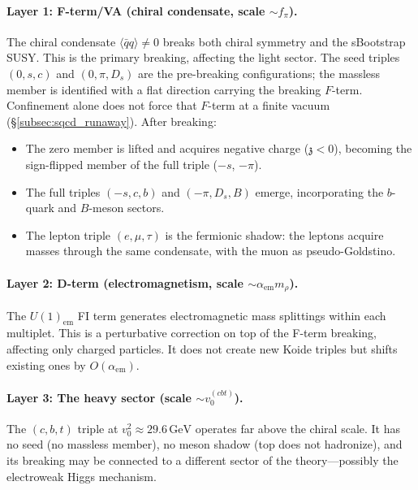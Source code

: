 \documentclass[12pt,a4paper]{article}
\newcommand{\GeV}{\,\text{GeV}}
\newcommand{\qqbar}{\langle\bar{q}q\rangle}
\newcommand{\zch}{\mathfrak{z}}
\begin{document}
\paragraph{Layer 1: F-term/VA (chiral condensate, scale $\sim f_\pi$).}
The chiral condensate $\qqbar \neq 0$ breaks both chiral symmetry 
and the sBootstrap SUSY. This is the primary breaking, affecting 
the light sector. The seed triples $(0, s, c)$ and $(0, \pi, D_s)$ 
are the pre-breaking configurations; the massless member is
identified with a flat direction carrying the breaking $F$-term.
Confinement alone does not force that $F$-term at a finite vacuum
(\S\ref{subsec:sqcd_runaway}). After 
breaking:
\begin{itemize}
\item The zero member is lifted and acquires negative charge 
($\zch < 0$), becoming the sign-flipped member of the full triple 
($-s$, $-\pi$).
\item The full triples $(-s,c,b)$ and $(-\pi, D_s, B)$ emerge, 
incorporating the $b$-quark and $B$-meson sectors.
\item The lepton triple $(e, \mu, \tau)$ is the fermionic shadow: 
the leptons acquire masses through the same condensate, with the 
muon as pseudo-Goldstino.
\end{itemize}

\paragraph{Layer 2: D-term (electromagnetism, scale $\sim \alpha_{\text{em}} m_\rho$).}
The $U(1)_{\text{em}}$ FI term generates electromagnetic mass 
splittings within each multiplet. This is a perturbative correction 
on top of the F-term breaking, affecting only charged particles. 
It does not create new Koide triples but shifts existing ones by 
$O(\alpha_{\text{em}})$.

\paragraph{Layer 3: The heavy sector (scale $\sim v_0^{(cbt)}$).}
The $(c,b,t)$ triple at $v_0^2 \approx 29.6\GeV$ operates far 
above the chiral scale. It has no seed (no massless member), no 
meson shadow (top does not hadronize), and its breaking may be 
connected to a different sector of the theory---possibly the 
electroweak Higgs mechanism.
\end{document}
